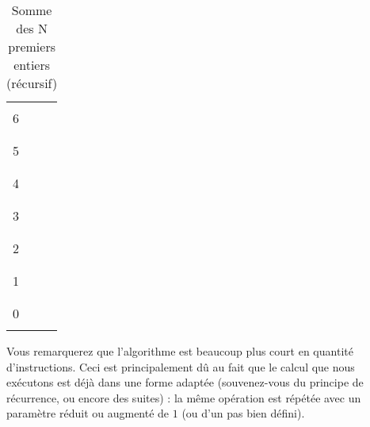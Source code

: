 \documentclass[11pt,a4paper]{article}
\begin{document}
\begin{table}[!ht]
\begin{minipage}{0.28\textwidth}
\begin{tabular}{|C{1.1cm}|C{1.1cm}|C{1.1cm}|}
              &        & \\
        6     &        & \\
              &        & \\
        \hline
              &        & \\
        5     &        & \\
              &        & \\
        \hline
              &        & \\
        4     &        & \\
              &        & \\
        \hline
              &        & \\
        3     &        & \\
              &        & \\
        \hline
              &        & \\
        2     &        & \\
              &        & \\
        \hline
              &        & \\
        1     &        & \\
              &        & \\
        \hline
              &        & \\
        0     &        & \\
              &        & \\
        \hline
    \end{tabular}
  \end{minipage}
  \caption{Somme des N premiers entiers (récursif)}
  \label{somme-n-premiers-entiers-recursif}
\end{table}


\bigskip

Vous remarquerez que l'algorithme est beaucoup plus court en quantité d'instructions.
Ceci est principalement dû au fait que le calcul que nous exécutons est déjà dans une forme adaptée (souvenez-vous du principe de récurrence, ou encore des suites) : la même opération est répétée avec un paramètre réduit ou augmenté de $ 1 $ (ou d'un pas bien défini).

\bigskip

\end{document}
